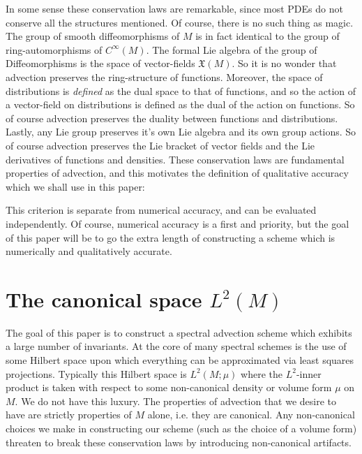 \documentclass[12pt]{amsart}
\begin{document}
In some sense these conservation laws are remarkable, since most PDEs do not conserve all the structures mentioned.
Of course, there is no such thing as magic.
The group of smooth diffeomorphisms of $M$ is in fact identical to the group of ring-automorphisms of $C^{\infty}(M)$.
The formal Lie algebra of the group of Diffeomorphisms is the space of vector-fields $\mathfrak{X}(M)$.
So it is no wonder that advection preserves the ring-structure of functions.
Moreover, the space of distributions is \emph{defined} as the dual space to that of functions, and so the action of a vector-field on distributions is defined
as the dual of the action on functions.
So of course advection preserves the duality between functions and distributions.
Lastly, any Lie group preserves it's own Lie algebra and its own group actions.
So of course advection preserves the Lie bracket of vector fields and the Lie derivatives of functions and densities.
These conservation laws are fundamental properties of advection, and this motivates the definition of qualitative accuracy
which we shall use in this paper:

\begin{center}
\end{center}

This criterion is separate from numerical accuracy, and can be evaluated independently.
Of course, numerical accuracy is a first and priority,
but the goal of this paper will be to go the extra length of constructing a scheme which is numerically
and qualitatively accurate.

\section{The canonical space $L^{2}(M)$}
\label{sec:half densities}
The goal of this paper is to construct a spectral advection scheme which exhibits a large number of invariants.
At the core of many spectral schemes is the use of some Hilbert space upon which everything can be approximated via least squares projections.
Typically this Hilbert space is $L^{2}(M ; \mu)$ where the $L^{2}$-inner product is taken with respect to some non-canonical density or volume form $\mu$ on $M$.
We do not have this luxury.
The properties of advection that we desire to have are strictly properties of $M$ alone, i.e. they are canonical.
Any non-canonical choices we make in constructing our scheme (such as the choice of a volume form) threaten to break these conservation laws by introducing non-canonical artifacts.
\end{document}
